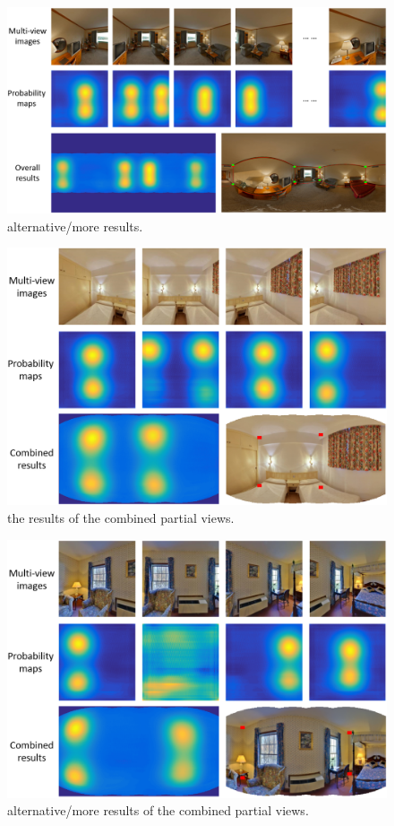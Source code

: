 \begin{figure}
	\centering
	\includegraphics[width=\linewidth]{figs/results3.png}
	\caption{alternative/more results. }
	\label{fig:results3}
\end{figure}

\begin{figure}
	\centering
	\includegraphics[width=\linewidth]{figs/partial1.png}
	\caption{the results of the combined partial views. }
	\label{fig:partial1}
\end{figure}

\begin{figure}
	\centering
	\includegraphics[width=\linewidth]{figs/partial2.png}
	\caption{alternative/more results of the combined partial views. }
	\label{fig:partial2}
\end{figure}


